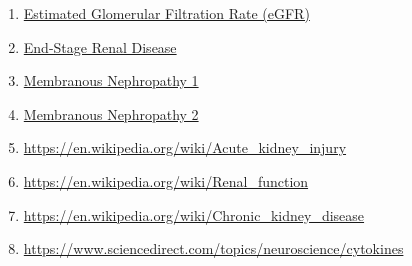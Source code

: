 \documentclass{article}
\begin{document}
\begin{enumerate}
    \item \href{https://labtestsonline.org/tests/estimated-glomerular-filtration-rate-egfr}{Estimated Glomerular Filtration Rate (eGFR)}
    \item \href{https://www.mayoclinic.org/diseases-conditions/end-stage-renal-disease/symptoms-causes/syc-20354532}{End-Stage Renal Disease}
    \item \href{https://unckidneycenter.org/kidneyhealthlibrary/glomerular-disease/membranous-nephropathy/}{Membranous Nephropathy 1}
    \item \href{https://www.mayoclinic.org/diseases-conditions/membranous-nephropathy/symptoms-causes/syc-20365189}{Membranous Nephropathy 2}
    \item \url{https://en.wikipedia.org/wiki/Acute_kidney_injury}
    \item \url{https://en.wikipedia.org/wiki/Renal_function}
    \item \url{https://en.wikipedia.org/wiki/Chronic_kidney_disease}
    \item \url{https://www.sciencedirect.com/topics/neuroscience/cytokines}
\end{enumerate}




\end{document}
